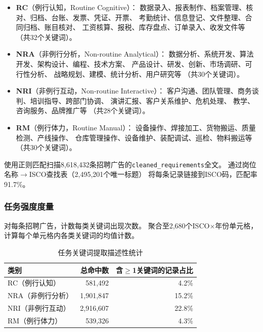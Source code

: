 \documentclass[12pt,a4paper]{ctexart}
\begin{document}
\begin{itemize}
\item \textbf{RC}（例行认知，Routine Cognitive）：
      数据录入、报表制作、档案管理、核对、归档、台账、发票、凭证、开票、
      考勤统计、信息登记、文件整理、合同归档、账目核对、
      工资核算、报税、库存盘点、订单录入、收发文件等
      （共32个关键词）。

\item \textbf{NRA}（非例行分析，Non-routine Analytical）：
      数据分析、系统开发、算法开发、架构设计、编程、技术方案、
      产品设计、研发、创新、市场调研、可行性分析、
      战略规划、建模、统计分析、用户研究等
      （共30个关键词）。

\item \textbf{NRI}（非例行互动，Non-routine Interactive）：
      客户沟通、团队管理、商务谈判、培训指导、跨部门协调、
      演讲汇报、客户关系维护、危机处理、
      教学、咨询服务、品牌推广等
      （共28个关键词）。

\item \textbf{RM}（例行体力，Routine Manual）：
      设备操作、焊接加工、货物搬运、质量检测、产线操作、
      仓库管理操作、设备维护、装配调试、巡检、物料搬运等
      （共30个关键词）。
\end{itemize}

使用正则匹配扫描8,618,432条招聘广告的\texttt{cleaned\_requirements}全文。
通过岗位名称$\to$ISCO查找表（2,495,201个唯一标题）
将每条记录链接到ISCO码，匹配率91.7\%。

\subsubsection{任务强度度量}

对每条招聘广告，计数每类关键词出现次数。
聚合至2,680个ISCO$\times$年份单元格，计算每个单元格内各类关键词的均值计数。

\begin{table}[h!]
\centering
\caption{任务关键词提取描述性统计}
\label{tab:task_desc}
\begin{tabular}{lrr}
\toprule
类别 & 总命中数 & 含$\geq$1关键词的记录占比 \\
\midrule
RC（例行认知） & 581,492 & 4.2\% \\
NRA（非例行分析） & 1,901,847 & 15.2\% \\
NRI（非例行互动） & 2,916,607 & 22.8\% \\
RM（例行体力） & 539,326 & 4.3\% \\
\bottomrule
\end{tabular}
\end{table}
\end{document}
